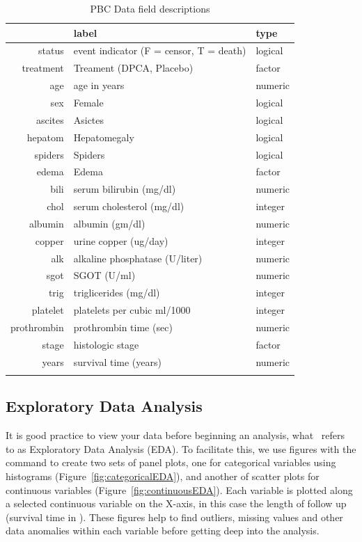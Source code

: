 \documentclass[nojss]{jss}\usepackage[]{graphicx}\usepackage[]{color}
\begin{document}
\begin{table}[ht]
\centering
{\footnotesize
\begin{tabular}{rll}
  \toprule
 & label & type \\ 
  \midrule
status & event indicator (F = censor, T = death) & logical \\ 
   \rowcolor[gray]{0.95}treatment & Treament (DPCA, Placebo) & factor \\ 
  age & age in years & numeric \\ 
   \rowcolor[gray]{0.95}sex & Female & logical \\ 
  ascites & Asictes & logical \\ 
   \rowcolor[gray]{0.95}hepatom & Hepatomegaly & logical \\ 
  spiders & Spiders & logical \\ 
   \rowcolor[gray]{0.95}edema & Edema & factor \\ 
  bili & serum bilirubin (mg/dl) & numeric \\ 
   \rowcolor[gray]{0.95}chol & serum cholesterol (mg/dl) & integer \\ 
  albumin & albumin (gm/dl) & numeric \\ 
   \rowcolor[gray]{0.95}copper & urine copper (ug/day) & integer \\ 
  alk & alkaline phosphatase (U/liter) & numeric \\ 
   \rowcolor[gray]{0.95}sgot & SGOT (U/ml) & numeric \\ 
  trig & triglicerides (mg/dl) & integer \\ 
   \rowcolor[gray]{0.95}platelet & platelets per cubic ml/1000 & integer \\ 
  prothrombin & prothrombin time (sec) & numeric \\ 
   \rowcolor[gray]{0.95}stage & histologic stage & factor \\ 
  years & survival time (years) & numeric \\ 
   \rowcolor[gray]{0.95} \bottomrule
\end{tabular}
}
\caption{PBC Data field descriptions} 
\label{T:dataLabs}
\end{table}


\subsection{Exploratory Data Analysis}\label{S:eda}

It is good practice to view your data before beginning an analysis, what~\cite{Tukey:1977} refers to as Exploratory Data Analysis (EDA). To facilitate this, we use  figures with the  command to create two sets of panel plots, one for categorical variables using histograms (Figure~\ref{fig:categoricalEDA}), and another of scatter plots for continuous variables (Figure~\ref{fig:continuousEDA}). Each variable is plotted along a selected continuous variable on the X-axis, in this case the length of follow up (survival time in ). These figures help to find outliers, missing values and other data anomalies within each variable before getting deep into the analysis.
\end{document}

